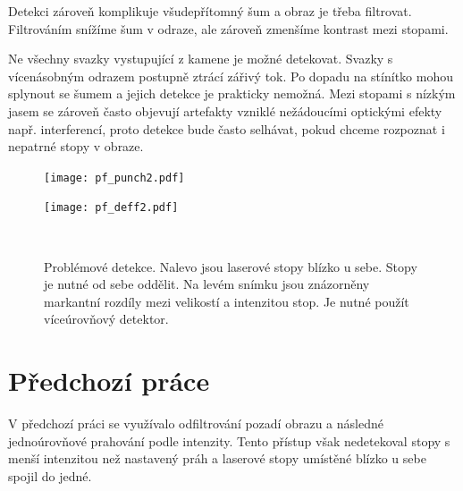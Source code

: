 Detekci zároveň komplikuje všudepřítomný šum a obraz je třeba filtrovat. Filtrováním snížíme šum v odraze, ale zároveň zmenšíme kontrast mezi stopami. 

Ne všechny svazky vystupující z kamene je možné detekovat. Svazky s vícenásobným odrazem postupně ztrácí zářivý tok. Po dopadu na stínítko mohou splynout se šumem a jejich detekce je prakticky nemožná. Mezi stopami s nízkým jasem se zároveň často objevují artefakty vzniklé nežádoucími optickými efekty např. interferencí, proto detekce bude často selhávat, pokud chceme rozpoznat i nepatrné stopy v obraze.




\begin{figure}[htbp]
    \centering
    \begin{minipage}[c]{0.48\textwidth}
        \centering\texttt{[image: pf\_punch2.pdf]}
    \end{minipage}
    \begin{minipage}[c]{0.48\textwidth}
        \centering\texttt{[image: pf\_deff2.pdf]}
    \end{minipage}
    \\
        \caption[Problémové detekce.]{Problémové detekce. Nalevo jsou laserové stopy blízko u sebe. Stopy je nutné od sebe oddělit. Na levém snímku jsou znázorněny markantní rozdíly mezi velikostí a intenzitou stop. Je nutné použít víceúrovňový detektor. }
        \label{Detekce}
\end{figure}

\section{Předchozí práce}

V předchozí práci \cite{Drapela} se využívalo odfiltrování pozadí obrazu a následné jednoúrovňové prahování podle intenzity. Tento přístup však nedetekoval stopy s menší intenzitou než nastavený práh a laserové stopy umístěné blízko u sebe spojil do jedné. 

